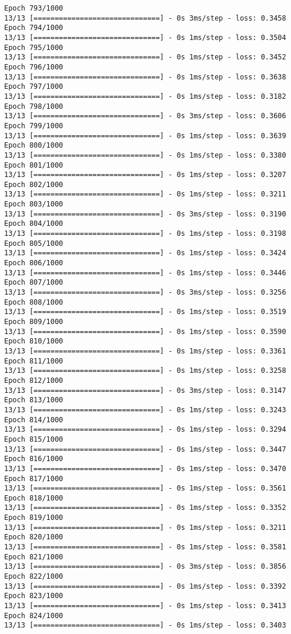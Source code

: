 \documentclass[11pt]{article}
\begin{document}
\begin{Verbatim}[commandchars=\\\{\}]
Epoch 793/1000
13/13 [==============================] - 0s 3ms/step - loss: 0.3458
Epoch 794/1000
13/13 [==============================] - 0s 1ms/step - loss: 0.3504
Epoch 795/1000
13/13 [==============================] - 0s 1ms/step - loss: 0.3452
Epoch 796/1000
13/13 [==============================] - 0s 1ms/step - loss: 0.3638
Epoch 797/1000
13/13 [==============================] - 0s 1ms/step - loss: 0.3182
Epoch 798/1000
13/13 [==============================] - 0s 3ms/step - loss: 0.3606
Epoch 799/1000
13/13 [==============================] - 0s 1ms/step - loss: 0.3639
Epoch 800/1000
13/13 [==============================] - 0s 1ms/step - loss: 0.3380
Epoch 801/1000
13/13 [==============================] - 0s 1ms/step - loss: 0.3207
Epoch 802/1000
13/13 [==============================] - 0s 1ms/step - loss: 0.3211
Epoch 803/1000
13/13 [==============================] - 0s 3ms/step - loss: 0.3190
Epoch 804/1000
13/13 [==============================] - 0s 1ms/step - loss: 0.3198
Epoch 805/1000
13/13 [==============================] - 0s 1ms/step - loss: 0.3424
Epoch 806/1000
13/13 [==============================] - 0s 1ms/step - loss: 0.3446
Epoch 807/1000
13/13 [==============================] - 0s 3ms/step - loss: 0.3256
Epoch 808/1000
13/13 [==============================] - 0s 1ms/step - loss: 0.3519
Epoch 809/1000
13/13 [==============================] - 0s 1ms/step - loss: 0.3590
Epoch 810/1000
13/13 [==============================] - 0s 1ms/step - loss: 0.3361
Epoch 811/1000
13/13 [==============================] - 0s 1ms/step - loss: 0.3258
Epoch 812/1000
13/13 [==============================] - 0s 3ms/step - loss: 0.3147
Epoch 813/1000
13/13 [==============================] - 0s 1ms/step - loss: 0.3243
Epoch 814/1000
13/13 [==============================] - 0s 1ms/step - loss: 0.3294
Epoch 815/1000
13/13 [==============================] - 0s 1ms/step - loss: 0.3447
Epoch 816/1000
13/13 [==============================] - 0s 1ms/step - loss: 0.3470
Epoch 817/1000
13/13 [==============================] - 0s 1ms/step - loss: 0.3561
Epoch 818/1000
13/13 [==============================] - 0s 1ms/step - loss: 0.3352
Epoch 819/1000
13/13 [==============================] - 0s 1ms/step - loss: 0.3211
Epoch 820/1000
13/13 [==============================] - 0s 1ms/step - loss: 0.3581
Epoch 821/1000
13/13 [==============================] - 0s 3ms/step - loss: 0.3856
Epoch 822/1000
13/13 [==============================] - 0s 1ms/step - loss: 0.3392
Epoch 823/1000
13/13 [==============================] - 0s 1ms/step - loss: 0.3413
Epoch 824/1000
13/13 [==============================] - 0s 1ms/step - loss: 0.3403

\end{Verbatim}
\end{document}
